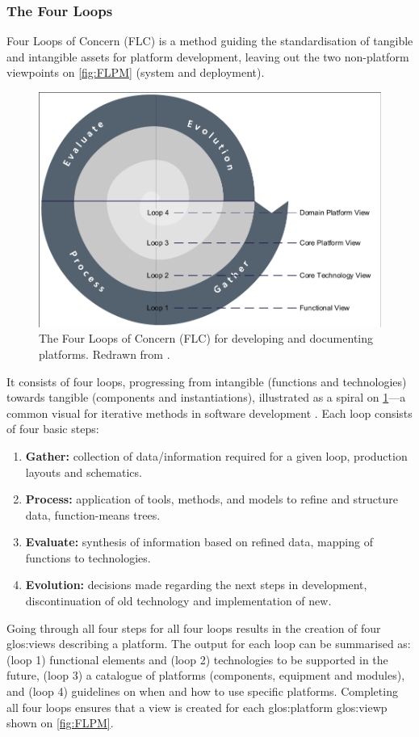 \subsubsection*{The Four Loops}
Four Loops of Concern (FLC) is a method guiding the standardisation of tangible and intangible assets for platform development, leaving out the two non-platform viewpoints on \cref{fig:FLPM} (system and deployment).
\begin{figure}[tb]
  \centering
  \includegraphics[width=.7\textwidth, trim=2 2 2 2, clip]{mainmatter/researchResults/figures/FLC.pdf}
  \caption[The Four Loops of Concern (FLC) for developing and documenting platforms.]
  {The Four Loops of Concern (FLC) for developing and documenting platforms.
  Redrawn from \parencite{SorensenMCPC2017}.}\label{fig:FLC}
\end{figure}
It consists of four loops, progressing from intangible (functions and technologies) towards tangible (components and instantiations), illustrated as a spiral on \cref{fig:FLC}---a common visual for iterative methods in software development \parencite{Maier2000}.
Each loop consists of four basic steps: 
\begin{enumerate}
  \item \textbf{Gather:} collection of data/information required for a given loop, \eg{} production layouts and schematics. 
  \item \textbf{Process:} application of tools, methods, and models to refine and structure data, \eg{} function-means trees.
  \item \textbf{Evaluate:} synthesis of information based on refined data, \eg{} mapping of functions to technologies.
  \item \textbf{Evolution:} decisions made regarding the next steps in development, \eg{} discontinuation of old technology and implementation of new.
\end{enumerate}
Going through all four steps for all four loops results in the creation of four \gls{glos:view}s describing a platform.
The output for each loop can be summarised as: (loop 1) functional elements and (loop 2) technologies to be supported in the future, (loop 3) a catalogue of platforms (components, equipment and modules), and (loop 4) guidelines on when and how to use specific platforms.
Completing all four loops ensures that a view is created for each \gls{glos:platform} \gls{glos:viewp} shown on \cref{fig:FLPM}.

